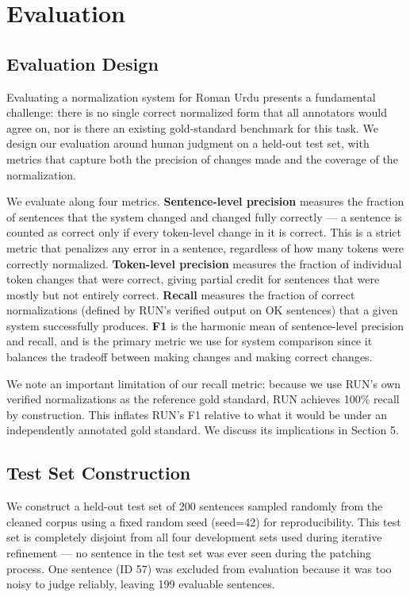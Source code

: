 \documentclass[11pt]{article}
\begin{document}
\section{Evaluation}

\subsection{Evaluation Design}
Evaluating a normalization system for Roman Urdu presents a fundamental challenge: there is no single correct normalized form that all annotators would agree on, nor is there an existing gold-standard benchmark for this task. We design our evaluation around human judgment on a held-out test set, with metrics that capture both the precision of changes made and the coverage of the normalization.

We evaluate along four metrics. \textbf{Sentence-level precision} measures the fraction of sentences that the system changed and changed fully correctly — a sentence is counted as correct only if every token-level change in it is correct. This is a strict metric that penalizes any error in a sentence, regardless of how many tokens were correctly normalized. \textbf{Token-level precision} measures the fraction of individual token changes that were correct, giving partial credit for sentences that were mostly but not entirely correct. \textbf{Recall} measures the fraction of correct normalizations (defined by RUN's verified output on OK sentences) that a given system successfully produces. \textbf{F1} is the harmonic mean of sentence-level precision and recall, and is the primary metric we use for system comparison since it balances the tradeoff between making changes and making correct changes.

We note an important limitation of our recall metric: because we use RUN's own verified normalizations as the reference gold standard, RUN achieves 100\% recall by construction. This inflates RUN's F1 relative to what it would be under an independently annotated gold standard. We discuss its implications in Section 5.


\subsection{Test Set Construction}
We construct a held-out test set of 200 sentences sampled randomly from the cleaned corpus using a fixed random seed (seed=42) for reproducibility. This test set is completely disjoint from all four development sets used during iterative refinement — no sentence in the test set was ever seen during the patching process. One sentence (ID 57) was excluded from evaluation because it was too noisy to judge reliably, leaving 199 evaluable sentences.
\end{document}
